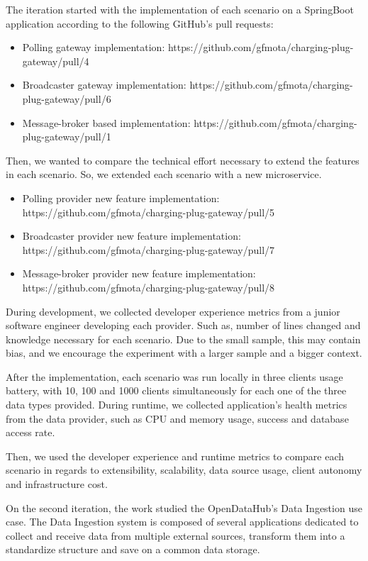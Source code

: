 The iteration started with the implementation of each scenario on a SpringBoot application according to the following GitHub's pull requests:

\begin{itemize}
    \item Polling gateway implementation: https://github.com/gfmota/charging-plug-gateway/pull/4
    \item Broadcaster gateway implementation: https://github.com/gfmota/charging-plug-gateway/pull/6
    \item Message-broker based implementation: https://github.com/gfmota/charging-plug-gateway/pull/1
\end{itemize}

Then, we wanted  to compare the technical effort necessary to extend the features in each scenario. So, we extended each scenario with a new microservice.

\begin{itemize}
    \item Polling provider new feature implementation: https://github.com/gfmota/charging-plug-gateway/pull/5
    \item Broadcaster provider new feature implementation: https://github.com/gfmota/charging-plug-gateway/pull/7
    \item Message-broker provider new feature implementation: https://github.com/gfmota/charging-plug-gateway/pull/8
\end{itemize}

During development, we collected developer experience metrics from a junior software engineer developing each provider. Such as, number of lines changed and knowledge necessary for each scenario. Due to the small sample, this may contain bias, and we encourage the experiment with a larger sample and a bigger context. 

After the implementation, each scenario was run locally in three clients usage battery, with 10, 100 and 1000 clients simultaneously for each one of the three data types provided. During runtime, we collected application’s health metrics from the data provider, such as CPU and memory usage, success and database access rate.

Then, we used the developer experience and runtime metrics to compare each scenario in regards to extensibility, scalability, data source usage, client autonomy and infrastructure cost.  

On the second iteration, the work studied the OpenDataHub's Data Ingestion use case. The Data Ingestion system is composed of several applications dedicated to collect and receive data from multiple external sources, transform them into a standardize structure and save on a common data storage.

